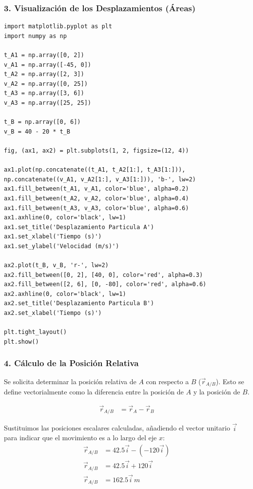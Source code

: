 \documentclass[12pt, a4paper]{article}
\begin{document}
\subsubsection*{3. Visualización de los Desplazamientos (Áreas)}
\begin{lstlisting}
import matplotlib.pyplot as plt
import numpy as np

t_A1 = np.array([0, 2])
v_A1 = np.array([-45, 0])
t_A2 = np.array([2, 3])
v_A2 = np.array([0, 25])
t_A3 = np.array([3, 6])
v_A3 = np.array([25, 25])

t_B = np.array([0, 6])
v_B = 40 - 20 * t_B

fig, (ax1, ax2) = plt.subplots(1, 2, figsize=(12, 4))

ax1.plot(np.concatenate((t_A1, t_A2[1:], t_A3[1:])), np.concatenate((v_A1, v_A2[1:], v_A3[1:])), 'b-', lw=2)
ax1.fill_between(t_A1, v_A1, color='blue', alpha=0.2)
ax1.fill_between(t_A2, v_A2, color='blue', alpha=0.4)
ax1.fill_between(t_A3, v_A3, color='blue', alpha=0.6)
ax1.axhline(0, color='black', lw=1)
ax1.set_title('Desplazamiento Particula A')
ax1.set_xlabel('Tiempo (s)')
ax1.set_ylabel('Velocidad (m/s)')

ax2.plot(t_B, v_B, 'r-', lw=2)
ax2.fill_between([0, 2], [40, 0], color='red', alpha=0.3)
ax2.fill_between([2, 6], [0, -80], color='red', alpha=0.6)
ax2.axhline(0, color='black', lw=1)
ax2.set_title('Desplazamiento Particula B')
ax2.set_xlabel('Tiempo (s)')

plt.tight_layout()
plt.show()
\end{lstlisting}

\subsubsection*{4. Cálculo de la Posición Relativa}
Se solicita determinar la posición relativa de $A$ con respecto a $B$ ($\vec{r}_{A/B}$). Esto se define vectorialmente como la diferencia entre la posición de $A$ y la posición de $B$.

\begin{align*}
\vec{r}_{A/B} &= \vec{r}_A - \vec{r}_B
\end{align*}

Sustituimos las posiciones escalares calculadas, añadiendo el vector unitario $\vec{i}$ para indicar que el movimiento es a lo largo del eje $x$:
\begin{align*}
\vec{r}_{A/B} &= 42.5\vec{i} - (-120\vec{i}) \\
\vec{r}_{A/B} &= 42.5\vec{i} + 120\vec{i} \\
\vec{r}_{A/B} &= 162.5\vec{i} \, \si{m}
\end{align*}
\end{document}
